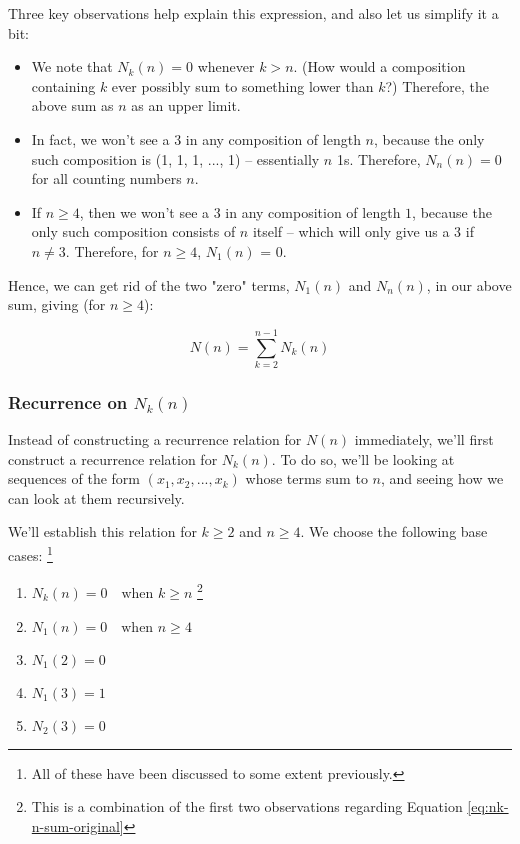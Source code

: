 Three key observations help explain this expression, and also let us simplify it a bit:

\begin{itemize}
\item We note that $N_k(n) = 0$ whenever $k > n$. (How would a composition containing $k$ ever possibly sum to something lower than $k$?) Therefore, the above sum as $n$ as an upper limit. 
\item In fact, we won't see a 3 in any composition of length $n$, because the only such composition is (1, 1, 1, ..., 1) -- essentially $n$ 1s. Therefore, $N_n(n) = 0$ for all counting numbers $n$.
\item If $n \geq 4$, then we won't see a 3 in any composition of length $1$, because the only such composition consists of $n$ itself -- which will only give us a 3 if $n \neq 3$. Therefore, for $n \geq 4$, $N_1(n)$ = 0. 
\end{itemize}

Hence, we can get rid of the two "zero" terms, $N_1(n)$ and $N_n(n)$, in our above sum, giving (for $n \geq 4$):

\begin{equation}
\label{composition-num-3s-n-nk}
N(n) = \sum_{k=2}^{n-1} N_k(n)
\end{equation}

\subsubsection{Recurrence on $N_k(n)$}

Instead of constructing a recurrence relation for $N(n)$ immediately, we'll first construct a recurrence relation for $N_k(n)$. To do so, we'll be looking at sequences of the form $(x_1, x_2, ..., x_k)$ whose terms sum to $n$, and seeing how we can look at them recursively.

We'll establish this relation for $k \geq 2$ and $n \geq 4$. We choose the following base cases: \footnote{All of these have been discussed to some extent previously.}

\begin{enumerate}
\item $N_k(n) = 0 \quad \text{when } k \geq n$ \label{eqbc-3s-1} \footnote{This is a combination of the first two observations regarding Equation \ref{eq:nk-n-sum-original}}
\item $N_1(n) = 0 \quad \text{when } n \geq 4$  \label{eqbc-3s-2}
\item $N_1(2) = 0$  \label{eqbc-3s-3}
\item $N_1(3) = 1$  \label{eqbc-3s-4}
\item $N_2(3) = 0$ \label{hooo}  \label{eqbc-3s-5}
\end{enumerate}

